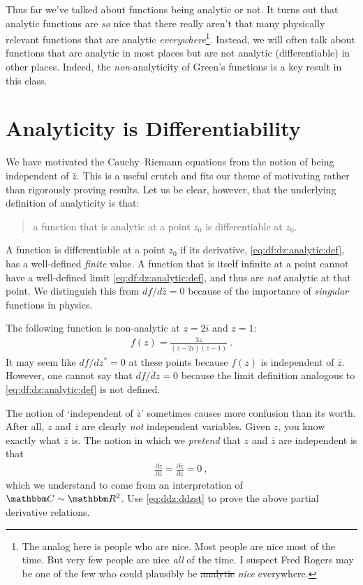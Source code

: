 Thus far we've talked about functions being analytic or not. It turns out that analytic functions are \emph{so} nice that there really aren't that many physically relevant functions that are analytic \emph{everywhere}\footnote{The analog here is people who are nice. Most people are nice most of the time. But very few people are nice \emph{all} of the time. I suspect Fred Rogers may be one of the few who could plausibly be \sout{analytic} \emph{nice} everywhere.}. Instead, we will often talk about functions that are analytic in most places but are not analytic (differentiable) in other places. Indeed, the \emph{non}-analyticity of Green's functions is a key result in this class.


\section{Analyticity is Differentiability}

We have motivated the Cauchy--Riemann equations from the notion of being independent of $\bar z$. This is a useful crutch and fits our theme of motivating rather than rigorously proving results. Let us be clear, however, that the underlying definition of analyticity is that:
\begin{quote}
a function that is analytic at a point $z_0$ is differentiable at $z_0$.
\end{quote}
A function is differentiable at a point $z_0$ if its derivative, \eqref{eq:df:dz:analytic:def}, has a well-defined \emph{finite} value. A function that is itself infinite at a point cannot have a well-defined limit \eqref{eq:df:dz:analytic:def}, and thus are \emph{not} analytic at that point.
We distinguish this from $df/d\bar z =0$ because of the importance of \emph{singular} functions in physics. 
\begin{example}
The following function is non-analytic at $z=2i$ and $z=1$:
\begin{align}
  f(z) = \frac{3z}{(z-2i)(z-1)} \ .
\end{align}
It may seem like $df/dz^* = 0$ at these points because $f(z)$ is independent of $\bar z$. However, one cannot say that $df/\bar dz=0$ because the limit definition analogous to \eqref{eq:df:dz:analytic:def} is not defined. 
\end{example}
\begin{exercise}
The notion of `independent of $\bar z$' sometimes causes more confusion than its worth. After all, $z$ and $\bar z$ are clearly \emph{not} independent variables. Given $z$, you know exactly what $\bar z$ is. The notion in which we \emph{pretend} that $z$ and $\bar z$ are independent is that
\begin{align}
  \frac{\partial z}{\partial \bar z} = 
  \frac{\partial \bar z}{\partial z} = 0 \ ,
\end{align}
which we understand to come from an interpretation of $\mathbbm C \sim \mathbbm R^2$. Use \eqref{eq:ddz:ddzst} to prove the above partial derivative relations.
\end{exercise}

